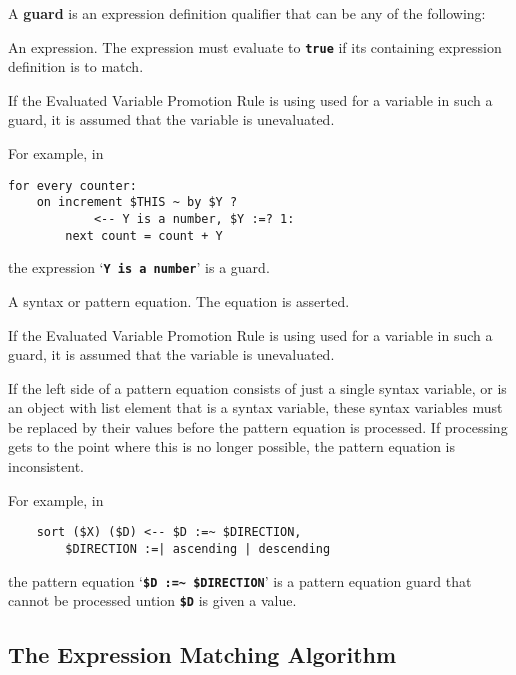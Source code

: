 \documentclass[12pt]{article}
\newcommand{\TT}[1]{{\tt \bfseries #1}}
\newcommand{\key}[1]{{\rm \bfseries #1}}
\newcommand{\TILDE}{\textasciitilde}
\newenvironment{indpar}[1][0.3in]%
	{\begin{list}{}%
		     {\setlength{\itemsep}{0in}%
		      \setlength{\topsep}{0in}%
		      \setlength{\parsep}{1ex}%
		      \setlength{\labelwidth}{#1}%
		      \setlength{\leftmargin}{#1}%
		      \addtolength{\leftmargin}{\labelsep}}%
	 \item}%
	{\end{list}}
\begin{document}
A \key{guard} is an expression definition qualifier that
can be any of the following:
\begin{enumerate}
\item An expression.  The expression must evaluate
to \TT{true} if its containing expression definition is to
match.

If the Evaluated Variable Promotion Rule is using used for
a variable in such a guard, it is assumed that the variable
is unevaluated.

For example, in
\begin{indpar}\begin{verbatim}
for every counter:
    on increment $THIS ~ by $Y ?
            <-- Y is a number, $Y :=? 1:
        next count = count + Y
\end{verbatim}\end{indpar}

the expression `\TT{Y is a number}' is a guard.

\item
A syntax or pattern equation.  The equation is asserted.

If the Evaluated Variable Promotion Rule is using used for
a variable in such a guard, it is assumed that the variable
is unevaluated.

If the left side of a pattern equation consists of just a single
syntax variable, or is an object with list element that is a syntax variable,
these syntax variables must be replaced by their
values before the pattern equation is processed.
If processing gets to the point where this is no longer possible,
the pattern equation is inconsistent.

For example, in
\begin{indpar}\begin{verbatim}
    sort ($X) ($D) <-- $D :=~ $DIRECTION,
        $DIRECTION :=| ascending | descending
\end{verbatim}\end{indpar}

the pattern equation `\TT{\$D :=\TILDE{} \$DIRECTION}' is a
pattern equation guard that cannot be processed untion \TT{\$D} is
given a value.

\end{enumerate}

\subsection{The Expression Matching Algorithm}
\label{EXPRESSION-MATCHING-ALGORITHM}
\end{document}
